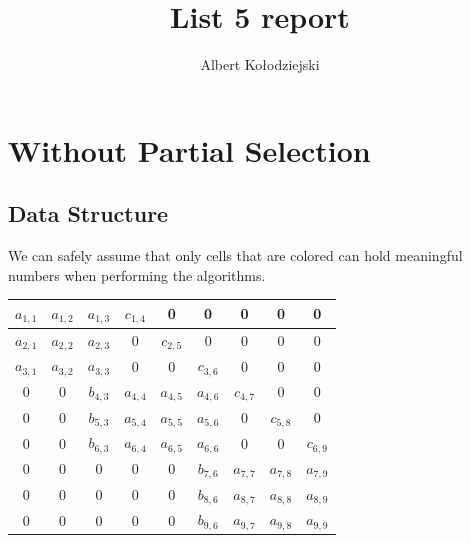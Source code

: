 \documentclass{article}
\title{List 5 report}
\author{Albert Kołodziejski}
\begin{document}
\maketitle
\section*{Without Partial Selection}
\subsection*{Data Structure}
We can safely assume that only cells that are colored can hold meaningful numbers when performing the algorithms. 
\begin{center}
    \begin{tabular}{| c|c|c | c|c|c | c|c|c |}
        \hline
        \cellcolor{blue!10} $a_{1,1}$ & \cellcolor{blue!10} $a_{1,2}$ & \cellcolor{blue!10} $a_{1,3}$ & \cellcolor{blue!10} $c_{1,4}$ & 0 & 0 & 0 & 0 & 0 \\
        \hline
        \cellcolor{red!10} $a_{2,1}$ & \cellcolor{red!10} $a_{2,2}$ &\cellcolor{red!10}  $a_{2,3}$ & \cellcolor{red!10} 0 & \cellcolor{red!10} $c_{2,5}$ & 0 & 0 & 0 & 0 \\
        \hline
        \cellcolor{green!10} $a_{3,1}$ & \cellcolor{green!10} $a_{3,2}$ & \cellcolor{green!10} $a_{3,3}$ & \cellcolor{green!10} 0 & \cellcolor{green!10} 0 & \cellcolor{green!10} $c_{3,6}$ & 0 & 0 & 0 \\
        \hline
        0 & 0 & \cellcolor{blue!25} $b_{4,3}$ & \cellcolor{blue!25} $a_{4,4}$ & \cellcolor{blue!25} $a_{4,5}$ & \cellcolor{blue!25} $a_{4, 6}$ & \cellcolor{blue!25} $c_{4,7}$ & 0 & 0 \\
        \hline
        0 & 0 & \cellcolor{red!25} $b_{5,3}$ & \cellcolor{red!25} $a_{5,4}$ & \cellcolor{red!25} $a_{5,5}$ & \cellcolor{red!25} $a_{5, 6}$ & \cellcolor{red!25} 0 & \cellcolor{red!25} $c_{5,8}$ & 0 \\
        \hline
        0 & 0 & \cellcolor{green!25}$b_{6,3}$ & \cellcolor{green!25} $a_{6,4}$ & \cellcolor{green!25} $a_{6,5}$ & \cellcolor{green!25} $a_{6, 6}$ & \cellcolor{green!25} 0 & \cellcolor{green!25} 0 & \cellcolor{green!25} $c_{6,9}$ \\
        \hline
        0 & 0 & 0 & 0 & 0 & \cellcolor{blue!50} $b_{7,6}$ & \cellcolor{blue!50}$a_{7,7}$ & \cellcolor{blue!50}$a_{7,8}$ & \cellcolor{blue!50} $a_{7,9}$ \\
        \hline
        0 & 0 & 0 & 0 & 0 & \cellcolor{red!50}$b_{8,6}$ & \cellcolor{red!50}$a_{8,7}$ & \cellcolor{red!50}$a_{8,8}$ & \cellcolor{red!50}$a_{8,9}$ \\
        \hline
        0 & 0 & 0 & 0 & 0 & \cellcolor{green!50}$b_{9,6}$ & \cellcolor{green!50}$a_{9,7}$ & \cellcolor{green!50}$a_{9,8}$ & \cellcolor{green!50}$a_{9,9}$ \\
        \hline

    \end{tabular}
\end{center}
\end{document}
